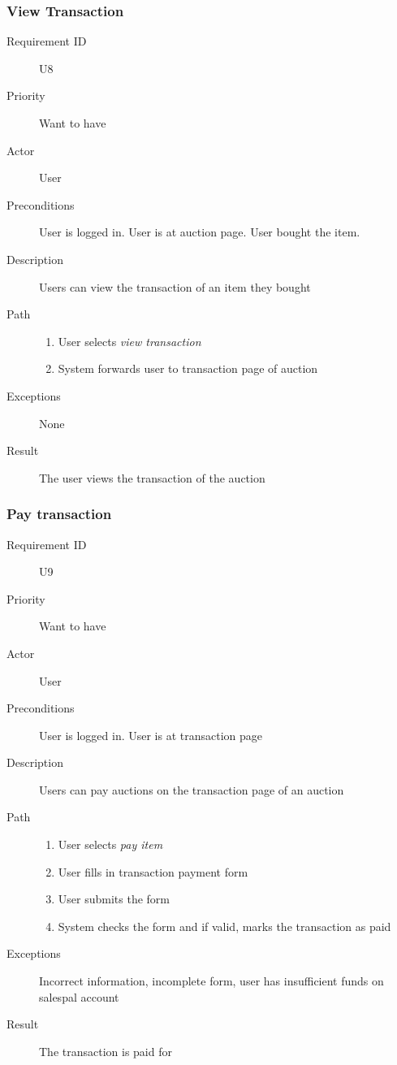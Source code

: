 		\subsubsection{View Transaction}
			\begin{description}
				\item[Requirement ID] U8
				\item[Priority] Want to have
				\item[Actor] User
				\item[Preconditions] User is logged in. User is at auction page. User bought the item.
				\item[Description] Users can view the transaction of an item they bought
				\item[Path]
 					\begin{enumerate}
						\item User selects \emph{view transaction}
						\item System forwards user to transaction page of auction
					\end{enumerate}
				\item[Exceptions] None
				\item[Result] The user views the transaction of the auction
			\end{description}
		\subsubsection{Pay transaction}
			\begin{description}
				\item[Requirement ID] U9
				\item[Priority] Want to have
				\item[Actor] User
				\item[Preconditions] User is logged in. User is at transaction page
				\item[Description] Users can pay auctions on the transaction page of an auction
				\item[Path]
 					\begin{enumerate}
						\item User selects \emph{pay item}
						\item User fills in transaction payment form
						\item User submits the form
						\item System checks the form and if valid, marks the transaction as paid
					\end{enumerate}
				\item[Exceptions] Incorrect information, incomplete form, user has insufficient funds on salespal account
				\item[Result] The transaction is paid for
			\end{description}
